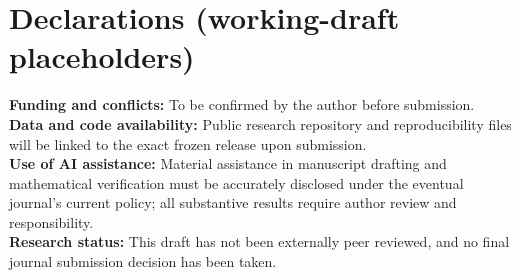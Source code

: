 \documentclass[11pt,a4paper]{article}
\theoremstyle{remark}\newtheorem{remark}[theorem]{Remark}
\begin{document}


\section*{Declarations (working-draft placeholders)}
\noindent\textbf{Funding and conflicts:} To be confirmed by the author before submission.\\
\textbf{Data and code availability:} Public research repository and reproducibility files will be linked to the exact frozen release upon submission.\\
\textbf{Use of AI assistance:} Material assistance in manuscript drafting and mathematical verification must be accurately disclosed under the eventual journal's current policy; all substantive results require author review and responsibility.\\
\textbf{Research status:} This draft has not been externally peer reviewed, and no final journal submission decision has been taken.
\end{document}
